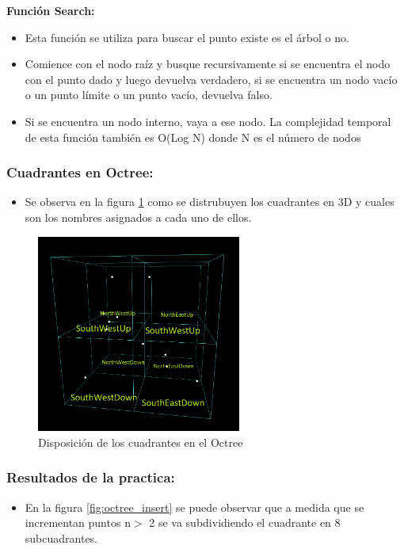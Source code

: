 \documentclass{article}
\begin{document}
\textbf{Función Search:}
\begin{itemize}
	\item Esta función se utiliza para buscar el punto existe es el árbol o no.
	\item Comience con el nodo raíz y busque recursivamente si se encuentra el nodo con el punto dado y luego devuelva verdadero, si se encuentra un nodo vacío o un punto límite o un punto vacío, devuelva falso.
	\item Si se encuentra un nodo interno, vaya a ese nodo. La complejidad temporal de esta función también es O(Log N) donde N es el número de nodos
\end{itemize}

\subsubsection{Cuadrantes en Octree: }
\begin{itemize}
	\item Se observa en la figura \ref{fig:octree_cuadrante} como se distrubuyen los cuadrantes en 3D y cuales son los nombres asignados a cada uno de ellos.
\end{itemize}
\begin{figure}[h!]
	\centering
	\includegraphics[width=0.6\textwidth]{img/octree_cuadrante.png}
	\caption{Disposición de los cuadrantes en el Octree}
	\label{fig:octree_cuadrante}
\end{figure}
\clearpage
\subsubsection{Resultados de la practica: }

\begin{itemize}
	\item En la figura \ref{fig:octree_insert} se puede observar que a medida que se incrementan puntos n$>$ 2 se va subdividiendo el cuadrante en 8 subcuadrantes.
\end{itemize}
\end{document}
